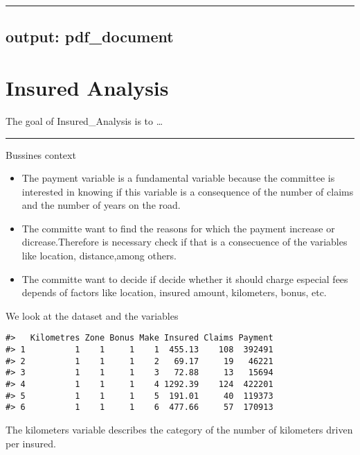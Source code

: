 \documentclass[
]{article}
\author{}
\date{\vspace{-2.5em}}
\begin{document}
\begin{center}\rule{0.5\linewidth}{0.5pt}\end{center}

\hypertarget{output-pdf_document}{%
\subsection{output: pdf\_document}\label{output-pdf_document}}

\hypertarget{insured-analysis}{%
\section{Insured Analysis}\label{insured-analysis}}

The goal of Insured\_Analysis is to \ldots{}

\begin{center}\rule{0.5\linewidth}{0.5pt}\end{center}

Bussines context

\begin{itemize}
\item
  The payment variable is a fundamental variable because the committee
  is interested in knowing if this variable is a consequence of the
  number of claims and the number of years on the road.
\item
  The committe want to find the reasons for which the payment increase
  or dicrease.Therefore is necessary check if that is a consecuence of
  the variables like location, distance,among others.
\item
  The committe want to decide if decide whether it should charge
  especial fees depends of factors like location, insured amount,
  kilometers, bonus, etc.
\end{itemize}

We look at the dataset and the variables

\begin{verbatim}
#>   Kilometres Zone Bonus Make Insured Claims Payment
#> 1          1    1     1    1  455.13    108  392491
#> 2          1    1     1    2   69.17     19   46221
#> 3          1    1     1    3   72.88     13   15694
#> 4          1    1     1    4 1292.39    124  422201
#> 5          1    1     1    5  191.01     40  119373
#> 6          1    1     1    6  477.66     57  170913
\end{verbatim}

The kilometers variable describes the category of the number of
kilometers driven per insured.
\end{document}
